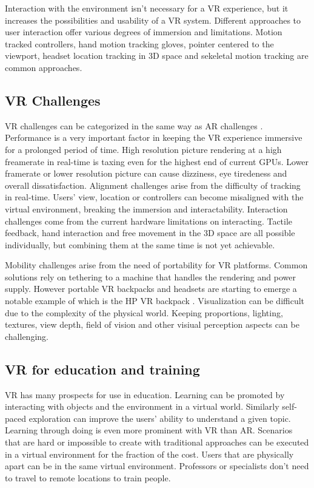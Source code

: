 \documentclass[12pt, a4paper,oneside, nocenter]{thesis}
\begin{document}
\par
Interaction with the environment isn't necessary for a VR experience, but it increases the possibilities and usability of a VR system.
Different approaches to user interaction offer various degrees of immersion and limitations. Motion tracked controllers, hand motion tracking gloves, pointer centered to the viewport, headset location tracking in 3D space and sekeletal motion tracking are common approaches.
\subsection{VR Challenges}
VR challenges can be categorized in the same way as AR challenges .
Performance is a very important factor in keeping the VR experience immersive for a prolonged period of time.
High resolution picture rendering at a high freamerate in real-time is taxing even for the highest end of current GPUs. 
Lower framerate or lower resolution picture can cause dizziness, eye tiredeness and overall dissatisfaction. Alignment challenges arise from the difficulty of tracking in real-time.
Users' view, location or controllers can become misaligned with the virtual environment, breaking the immersion and interactability.
Interaction challenges come from the current hardware limitations on interacting. Tactile feedback, hand interaction and free movement in the 3D space are all possible individually, but combining them at the same time is not yet achievable.
\par %
Mobility challenges arise from the need of portability for VR platforms. Common solutions
rely on tethering to a machine that handles the rendering and power supply. However portable VR backpacks and headsets are starting to emerge a notable example of which is the HP VR backpack \citeyearpar{hp-vrbackpack}.
Visualization can be difficult due to the complexity of the physical world. Keeping proportions, lighting, textures, view depth, field of vision and other visiual perception aspects can be challenging.
\subsection{VR for education and training}
VR has many prospects for use in education. Learning can be promoted by interacting with objects and the environment in a virtual world. 
Similarly self-paced exploration can improve the users' ability to understand a given topic.
Learning through doing is even more prominent with VR than AR. Scenarios that are hard or impossible to create with traditional approaches can be executed in a virtual environment for the fraction of the cost.
Users that are physically apart can be in the same virtual environment.
Professors or specialists don't need to travel to remote locations to train people.
\end{document}
